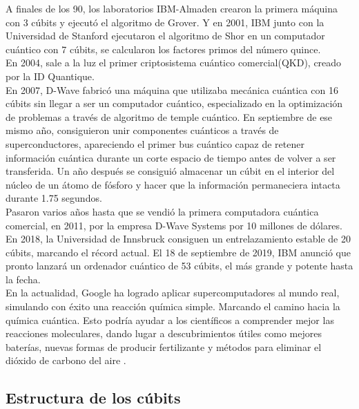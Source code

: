 A finales de los 90, los laboratorios IBM-Almaden crearon la primera máquina con 3 cúbits y ejecutó el algoritmo de Grover. Y en 2001, IBM junto con la Universidad de Stanford ejecutaron el algoritmo de Shor en un computador cuántico con 7 cúbits, se calcularon los factores primos del número quince.\\

\newpage
En 2004, sale a la luz el primer criptosistema cuántico comercial(QKD), creado por la ID Quantique.\\

En 2007, D-Wave fabricó una máquina que utilizaba mecánica cuántica con 16 cúbits sin llegar a ser un computador cuántico, especializado en la optimización de problemas a través de algoritmo de temple cuántico. En septiembre de ese mismo año, consiguieron unir componentes cuánticos a través de superconductores, apareciendo el primer bus cuántico capaz de retener información cuántica durante un corte espacio de tiempo antes de volver a ser transferida. Un año después se consiguió almacenar un cúbit en el interior del núcleo de un átomo de fósforo y hacer que la información permaneciera intacta durante 1.75 segundos.\\

Pasaron varios años hasta que se vendió la primera computadora cuántica comercial, en 2011, por la empresa D-Wave Systems por 10 millones de dólares.\\

En 2018, la Universidad de Innsbruck consiguen un entrelazamiento estable de 20 cúbits, marcando el récord actual. El 18 de septiembre de 2019, IBM anunció que pronto lanzará un ordenador cuántico de 53 cúbits, el más grande y potente hasta la fecha.\\

En la actualidad, Google ha logrado aplicar supercomputadores al mundo real, simulando con éxito una reacción química simple. Marcando el camino hacia la química cuántica. Esto podría ayudar a los científicos a comprender mejor las reacciones moleculares, dando lugar a descubrimientos útiles como mejores baterías, nuevas formas de producir fertilizante y métodos para eliminar el dióxido de carbono del aire \cite{quimica-cuantica}.\\

\subsection{Estructura de los cúbits}


